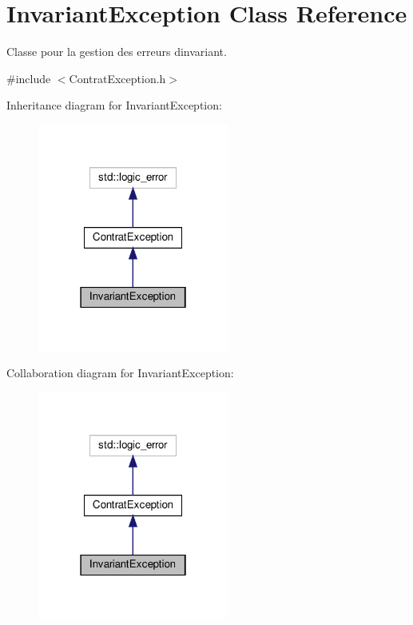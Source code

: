 \hypertarget{classInvariantException}{}\section{Invariant\+Exception Class Reference}
\label{classInvariantException}


Classe pour la gestion des erreurs d\textquotesingle{}invariant.  




{\ttfamily \#include $<$Contrat\+Exception.\+h$>$}



Inheritance diagram for Invariant\+Exception\+:\nopagebreak
\begin{figure}[H]
\begin{center}
\leavevmode
\includegraphics[width=178pt]{classInvariantException__inherit__graph}
\end{center}
\end{figure}


Collaboration diagram for Invariant\+Exception\+:\nopagebreak
\begin{figure}[H]
\begin{center}
\leavevmode
\includegraphics[width=178pt]{classInvariantException__coll__graph}
\end{center}
\end{figure}
